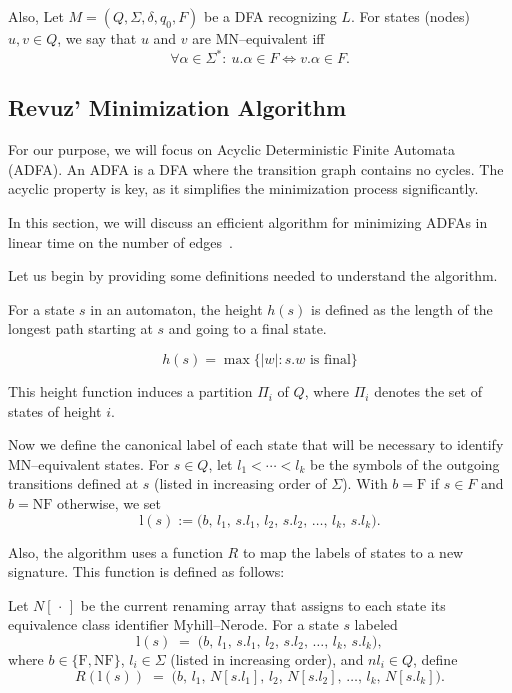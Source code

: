 Also, Let $M=(Q,\Sigma,\delta,q_0,F)$ be a DFA recognizing $L$. For states (nodes) $u,v\in Q$, we say that $u$ and $v$ are MN--equivalent iff
\[
\forall \alpha \in \Sigma^*:\ u.\alpha \in F \iff v.\alpha \in F.
\]

\subsection{Revuz' Minimization Algorithm} \label{sec:revuz}
For our purpose, we will focus on Acyclic Deterministic Finite Automata (ADFA). An ADFA is a DFA where the transition graph contains no cycles. The acyclic property is key, as it simplifies the minimization process significantly. 

In this section, we will discuss an efficient algorithm for minimizing ADFAs in linear time on the number of edges~\cite{revuz1992minimisation}.

Let us begin by providing some definitions needed to understand the algorithm.

\begin{definition} \label{def:height}
    For a state $s$ in an automaton, the height $h(s)$ is defined as the length of the longest path starting at $s$ and going to a final state. 

    $$h(s) = \max\{|w|:s.w \text{ is final}\}$$
\end{definition}

This height function induces a partition $\Pi_i$ of $Q$, where $\Pi_i$ denotes the set of states of height $i$.

\begin{comment}
\begin{definition}[Distinguished set]
    We say that a set $\Pi_i$ is distinguished if no pair of states in $\Pi_i$ are MN--equivalent.
\end{definition}
\end{comment}

Now we define the canonical label of each state that will be necessary to identify MN--equivalent states. For $s\in Q$, let $l_1<\cdots<l_k$ be the symbols of the outgoing transitions defined at $s$ (listed in increasing order of $\Sigma$). With $b=\text{F}$ if $s\in F$ and $b=\text{NF}$ otherwise, we set
\[
\mathrm{l}(s) := \big(b,\, l_1,\, s.l_1,\, l_2,\, s.l_2,\, \dots,\, l_k,\, s.l_k\big).
\]

Also, the algorithm uses a function $R$ to map the labels of states to a new signature. This function is defined as follows:
\begin{definition} \label{def:R}
Let $N[\,\cdot\,]$ be the current renaming array that assigns to each state its equivalence class identifier Myhill--Nerode.  
For a state $s$ labeled
\[
\mathrm{l}(s) \;=\; \big(b,\, l_1,\, s.l_1,\, l_2,\, s.l_2,\, \dots,\, l_k,\, s.l_k\big),
\]
where $b \in \{\text{F},\text{NF}\}$, $l_i \in \Sigma$ (listed in increasing order), and $nl_i \in Q$, define
\[
R\!\left(\mathrm{l}(s)\right) \;=\; \big(b,\, l_1,\, N[s.l_1],\, l_2,\, N[s.l_2],\, \dots,\, l_k,\, N[s.l_k]\big).
\]
\end{definition}

